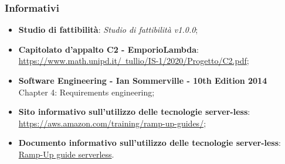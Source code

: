     \subsubsection{Informativi}
    \begin{itemize}
        \item \textbf{Studio di fattibilità}: \textit{Studio di fattibilità v1.0.0};
        \item \textbf{Capitolato d'appalto C2 - EmporioLambda}:\\ \href{https://www.math.unipd.it/~tullio/IS-1/2020/Progetto/C2.pdf}{https://www.math.unipd.it/~tullio/IS-1/2020/Progetto/C2.pdf};
        \item \textbf{Software Engineering - Ian Sommerville - 10th Edition 2014}\\
        Chapter 4: Requirements engineering;
        \item \textbf{Sito informativo sull'utilizzo delle tecnologie server-less}:\\ \href{https://aws.amazon.com/training/ramp-up-guides/}{https://aws.amazon.com/training/ramp-up-guides/};
        \item \textbf{Documento informativo sull'utilizzo delle tecnologie server-less}:\\ \href{https://d1.awsstatic.com/training-and-certification/ramp-up_guides/Ramp-Up_Guide_Serverless.pdf}{Ramp-Up guide serverless}.
    \end{itemize}